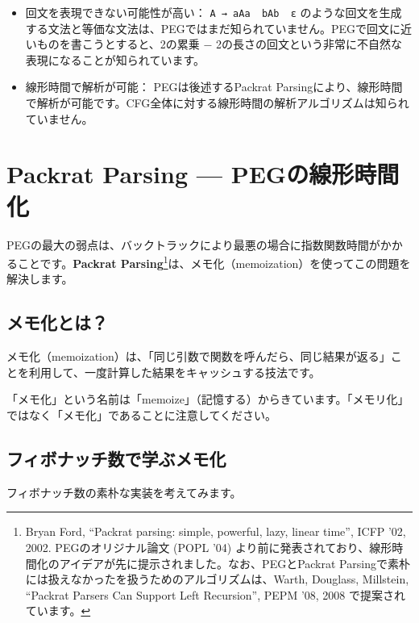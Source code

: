 \begin{itemize}
\item
  回文を表現できない可能性が高い：
  \texttt{A\ →\ aAa\ \textbar{}\ bAb\ \textbar{}\ ε}
  のような回文を生成する文法と等価な文法は、PEGではまだ知られていません。PEGで回文に近いものを書こうとすると、2の累乗 − 2の長さの回文という非常に不自然な表現になることが知られています。
\item
  線形時間で解析が可能： PEGは後述するPackrat
  Parsingにより、線形時間で解析が可能です。CFG全体に対する線形時間の解析アルゴリズムは知られていません。
\end{itemize}

\section{Packrat Parsing --- PEGの線形時間化}

PEGの最大の弱点は、バックトラックにより最悪の場合に指数関数時間がかかることです。\textbf{\sffamily Packrat
Parsing}\footnote{Bryan Ford, ``Packrat parsing: simple, powerful, lazy,
  linear time'', ICFP '02, 2002. PEGのオリジナル論文 (POPL '04)
  より前に発表されており、線形時間化のアイデアが先に提示されました。なお、PEGとPackrat
  Parsingで素朴には扱えなかったを扱うためのアルゴリズムは、Warth,
  Douglass, Millstein, ``Packrat Parsers Can Support Left Recursion'',
  PEPM '08, 2008 で提案されています。}は、メモ化（memoization）を使ってこの問題を解決します。

\subsection{メモ化とは？}

メモ化（memoization）は、「同じ引数で関数を呼んだら、同じ結果が返る」ことを利用して、一度計算した結果をキャッシュする技法です。

「メモ化」という名前は「memoize」（記憶する）からきています。「メモリ化」ではなく「メモ化」であることに注意してください。

\subsection{フィボナッチ数で学ぶメモ化}

フィボナッチ数の素朴な実装を考えてみます。

